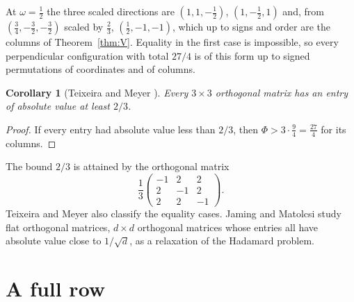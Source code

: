 \documentclass[11pt]{amsart}
\newtheorem{cor}[thm]{Corollary}
\theoremstyle{remark}
\numberwithin{equation}{section}
\begin{document}
At $\omega=\frac12$ the three scaled directions are $(1,1,-\frac12)$, $(1,-\frac12,1)$ and, from $(\frac34,-\frac32,-\frac32)$ scaled by $\frac23$, $(\frac12,-1,-1)$, which up to signs and order are the columns of Theorem~\ref{thm:V}. Equality in the first case is impossible, so every perpendicular configuration with total $27/4$ is of this form up to signed permutations of coordinates and of columns.

\begin{cor}[Teixeira and Meyer {\cite[Theorem~V.1]{TeixeiraMeyer}}]\label{cor:twothirds}
Every $3\times3$ orthogonal matrix has an entry of absolute value at least $2/3$.
\end{cor}

\begin{proof}
If every entry had absolute value less than $2/3$, then $\Phi>3\cdot\frac94=\frac{27}4$ for its columns.
\end{proof}

The bound $2/3$ is attained by the orthogonal matrix
\[
\frac13\begin{pmatrix}-1&2&2\\2&-1&2\\2&2&-1\end{pmatrix}.
\]
Teixeira and Meyer also classify the equality cases. Jaming and Matolcsi \cite{JamingMatolcsi} study flat orthogonal matrices, $d\times d$ orthogonal matrices whose entries all have absolute value close to $1/\sqrt d$, as a relaxation of the Hadamard problem.

\section{A full row}\label{sec:full}
\end{document}
